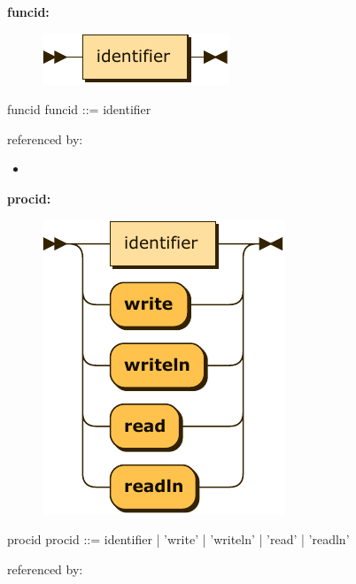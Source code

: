 \documentclass[10pt,a4paper,twoside]{article}
\providecommand{\tightlist}{%
  \setlength{\itemsep}{0pt}\setlength{\parskip}{0pt}}
\newcounter{grammarbox}[section]
\begin{document}
\textbf{funcid:}

\begin{figure}[H]
\centering
\includegraphics{diagram/funcid.pdf}

\end{figure}

\begin{grammarbox}{funcid}
\vspace{0.5em}
funcid   ::= identifier
\end{grammarbox}

referenced by:

\begin{itemize}
\tightlist
\item
\end{itemize}

\textbf{procid:}

\begin{figure}[H]
\centering
\includegraphics{diagram/procid.pdf}

\end{figure}

\begin{grammarbox}{procid}
\vspace{0.5em}
procid   ::= identifier
           | 'write'
           | 'writeln'
           | 'read'
           | 'readln'
\end{grammarbox}

referenced by:
\end{document}
